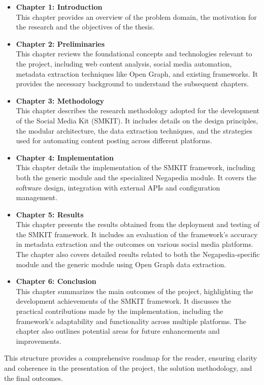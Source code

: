 \begin{itemize}
    \item \textbf{Chapter 1: Introduction} \\
    This chapter provides an overview of the problem domain, the motivation for the research and the objectives of the thesis.

    \item \textbf{Chapter 2: Preliminaries} \\
    This chapter reviews the foundational concepts and technologies relevant to the project, including web content analysis, social media automation, metadata extraction techniques like Open Graph, and existing frameworks. It provides the necessary background to understand the subsequent chapters.

    \item \textbf{Chapter 3: Methodology} \\
    This chapter describes the research methodology adopted for the development of the Social Media Kit (SMKIT). It includes details on the design principles, the modular architecture, the data extraction techniques, and the strategies used for automating content posting across different platforms.

    \item \textbf{Chapter 4: Implementation} \\
    This chapter details the implementation of the SMKIT framework, including both the generic module and the specialized Negapedia module. It covers the software design, integration with external APIs and configuration management.

    \item \textbf{Chapter 5: Results} \\
    This chapter presents the results obtained from the deployment and testing of the SMKIT framework. It includes an evaluation of the framework's accuracy in metadata extraction and the outcomes on various social media platforms. The chapter also covers detailed results related to both the Negapedia-specific module and the generic module using Open Graph data extraction.

    \item \textbf{Chapter 6: Conclusion} \\
    This chapter summarizes the main outcomes of the project, highlighting the development achievements of the SMKIT framework. It discusses the practical contributions made by the implementation, including the framework's adaptability and functionality across multiple platforms. The chapter also outlines potential areas for future enhancements and improvements.

\end{itemize}

This structure provides a comprehensive roadmap for the reader, ensuring clarity and coherence in the presentation of the project, the solution methodology, and the final outcomes.

